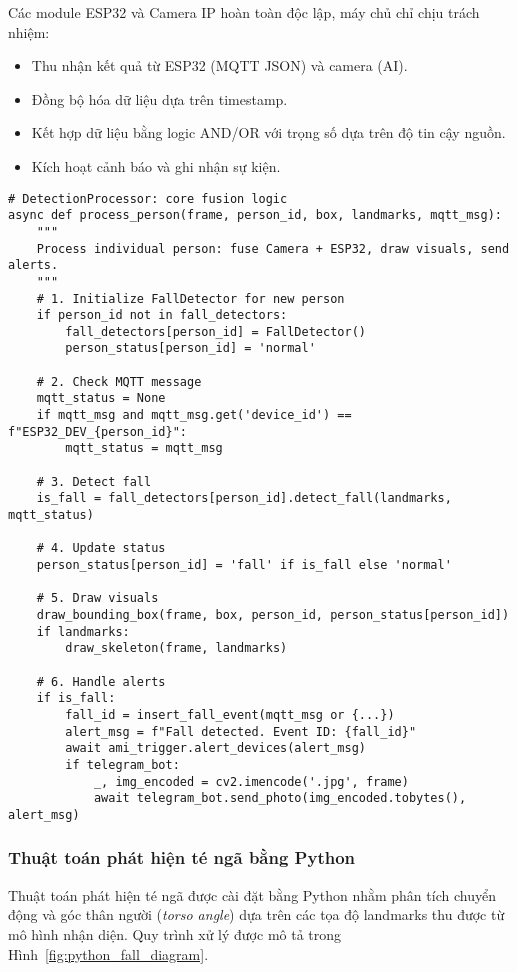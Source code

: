 Các module ESP32 và Camera IP hoàn toàn độc lập, máy chủ chỉ chịu trách nhiệm:
\begin{itemize}
    \item Thu nhận kết quả từ ESP32 (MQTT JSON) và camera (AI).
    \item Đồng bộ hóa dữ liệu dựa trên timestamp.
    \item Kết hợp dữ liệu bằng logic AND/OR với trọng số dựa trên độ tin cậy nguồn.
    \item Kích hoạt cảnh báo và ghi nhận sự kiện.
\end{itemize}

\begin{verbatim}
# DetectionProcessor: core fusion logic
async def process_person(frame, person_id, box, landmarks, mqtt_msg):
    """
    Process individual person: fuse Camera + ESP32, draw visuals, send alerts.
    """
    # 1. Initialize FallDetector for new person
    if person_id not in fall_detectors:
        fall_detectors[person_id] = FallDetector()
        person_status[person_id] = 'normal'

    # 2. Check MQTT message
    mqtt_status = None
    if mqtt_msg and mqtt_msg.get('device_id') == f"ESP32_DEV_{person_id}":
        mqtt_status = mqtt_msg

    # 3. Detect fall
    is_fall = fall_detectors[person_id].detect_fall(landmarks, mqtt_status)

    # 4. Update status
    person_status[person_id] = 'fall' if is_fall else 'normal'

    # 5. Draw visuals
    draw_bounding_box(frame, box, person_id, person_status[person_id])
    if landmarks:
        draw_skeleton(frame, landmarks)

    # 6. Handle alerts
    if is_fall:
        fall_id = insert_fall_event(mqtt_msg or {...})
        alert_msg = f"Fall detected. Event ID: {fall_id}"
        await ami_trigger.alert_devices(alert_msg)
        if telegram_bot:
            _, img_encoded = cv2.imencode('.jpg', frame)
            await telegram_bot.send_photo(img_encoded.tobytes(), alert_msg)
\end{verbatim}


\subsubsection{Thuật toán phát hiện té ngã bằng Python}

Thuật toán phát hiện té ngã được cài đặt bằng Python nhằm phân tích chuyển động và góc thân người (\textit{torso angle}) dựa trên các tọa độ landmarks thu được từ mô hình nhận diện. 
Quy trình xử lý được mô tả trong Hình~\ref{fig:python_fall_diagram}.

